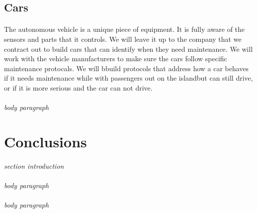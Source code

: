 \documentclass[12pt]{article}
\begin{document}
	\subsection{Cars}
	\paragraph{} The autonomous vehicle is a unique piece of equipment. It is fully 
	aware of the sensors and parts that it controls. We will leave it up to the 
	company that we contract out to build cars that can identify when they need 
	maintenance. We will work with the vehicle manufacturers to make sure the cars 
	follow specific maintenance protocals. We will bbuild protocols that address how 
	a car behaves if it needs maintenance while with passengers out on the islandbut 
	can still drive, or if it is more serious and the car can not drive.
	
	\paragraph{} \textit{body paragraph}
	
\section{Conclusions}
\paragraph{} \textit{section introduction} 
\paragraph{} \textit{body paragraph}
\paragraph{} \textit{body paragraph}


\end{document}
